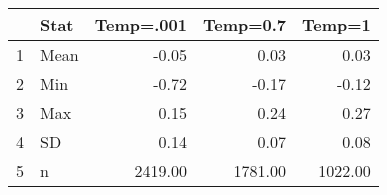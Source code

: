 \begin{table}[ht]
\centering
\begin{tabular}{rlrrr}
  \hline
 & Stat & Temp=.001 & Temp=0.7 & Temp=1 \\ 
  \hline
1 & Mean & -0.05 & 0.03 & 0.03 \\ 
  2 & Min & -0.72 & -0.17 & -0.12 \\ 
  3 & Max & 0.15 & 0.24 & 0.27 \\ 
  4 & SD & 0.14 & 0.07 & 0.08 \\ 
  5 & n & 2419.00 & 1781.00 & 1022.00 \\ 
   \hline
\end{tabular}
\end{table}
